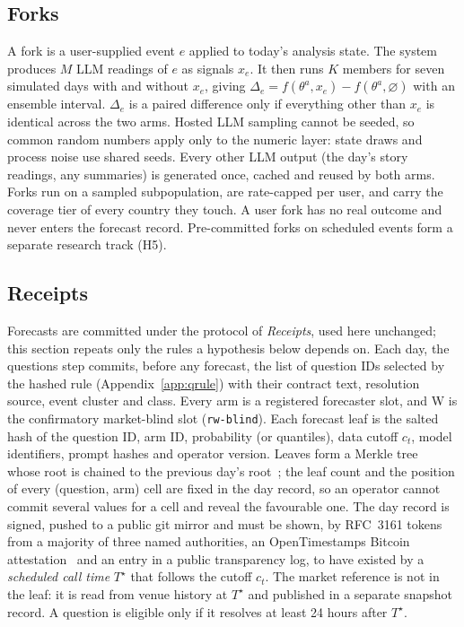 \documentclass[11pt]{article}
\begin{document}
\subsection{Forks}\label{sec:forks}
A fork is a user-supplied event $e$ applied to today's analysis state. The system produces $M$ LLM readings of $e$ as signals $x_e$. It then runs $K$ members for seven simulated days with and without $x_e$, giving $\Delta_e = f(\theta^a, x_e) - f(\theta^a, \varnothing)$ with an ensemble interval. $\Delta_e$ is a paired difference only if everything other than $x_e$ is identical across the two arms. Hosted LLM sampling cannot be seeded, so common random numbers apply only to the numeric layer: state draws and process noise use shared seeds. Every other LLM output (the day's story readings, any summaries) is generated once, cached and reused by both arms. Forks run on a sampled subpopulation, are rate-capped per user, and carry the coverage tier of every country they touch. A user fork has no real outcome and never enters the forecast record. Pre-committed forks on scheduled events form a separate research track (H5).

\subsection{Receipts}\label{sec:receipts}
Forecasts are committed under the protocol of \emph{Receipts}, used here unchanged; this section repeats only the rules a hypothesis below depends on. Each day, the \textsf{questions} step commits, before any forecast, the list of question IDs selected by the hashed rule (Appendix~\ref{app:qrule}) with their contract text, resolution source, event cluster and class. Every arm is a registered forecaster slot, and W is the confirmatory market-blind slot (\texttt{rw-blind}). Each forecast leaf is the salted hash of the question ID, arm ID, probability (or quantiles), data cutoff $c_t$, model identifiers, prompt hashes and operator version. Leaves form a Merkle tree~\citep{merkle1988digital} whose root is chained to the previous day's root~\citep{haber1991timestamp}; the leaf count and the position of every (question, arm) cell are fixed in the day record, so an operator cannot commit several values for a cell and reveal the favourable one. The day record is signed, pushed to a public git mirror and must be shown, by RFC~3161 tokens~\citep{rfc3161} from a majority of three named authorities, an OpenTimestamps Bitcoin attestation~\citep{opentimestamps} and an entry in a public transparency log, to have existed by a \emph{scheduled call time} $T^\star$ that follows the cutoff $c_t$. The market reference is not in the leaf: it is read from venue history at $T^\star$ and published in a separate snapshot record. A question is eligible only if it resolves at least 24 hours after $T^\star$.
\end{document}

